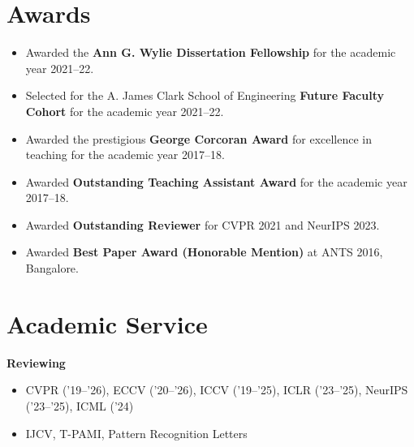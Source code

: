 \documentclass[10pt, letterpaper]{article}
\begin{document}
    
    \section{Awards}

\begin{itemize}[itemsep=0pt, parsep=0pt, topsep=2pt]
    \item Awarded the \textbf{Ann G. Wylie Dissertation Fellowship} for the academic year 2021--22.
     \item Selected for the A. James Clark School of Engineering \textbf{Future Faculty Cohort} for the academic year 2021--22.
    \item Awarded the prestigious \textbf{George Corcoran Award} for excellence in teaching for the academic year 2017--18.
    \item Awarded \textbf{Outstanding Teaching Assistant Award} for the academic year 2017--18.
    \item Awarded \textbf{Outstanding Reviewer} for CVPR 2021 and NeurIPS 2023.
    \item Awarded \textbf{Best Paper Award (Honorable Mention)} at ANTS 2016, Bangalore.

\end{itemize}


    
    \section{Academic Service}
\textbf{Reviewing}
\begin{itemize}[leftmargin=*, align=left, labelsep=0.2cm, itemsep=0cm, topsep=0cm]
    \item CVPR ('19--'26), ECCV ('20--'26), ICCV ('19--'25), ICLR ('23--'25), NeurIPS ('23--'25), ICML ('24)
    \item IJCV, T-PAMI, Pattern Recognition Letters
    
\end{itemize}
\end{document}
